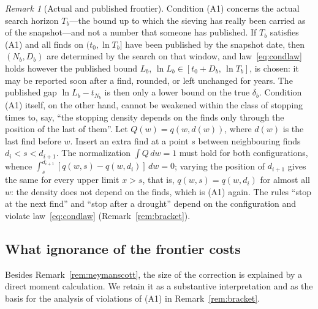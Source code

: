 \documentclass[11pt,a4paper]{article}
\theoremstyle{plain}
\theoremstyle{remark}
\newtheorem{remark}{Remark}
\begin{document}
\begin{remark}[Actual and published frontier]\label{rem:weaker}
Condition (A1) concerns the actual search horizon $T_b$---the bound up to which the
sieving has really been carried as of the snapshot---and not a number that someone
has published. If $T_b$ satisfies (A1) and all finds on $(t_0,\ln T_b]$ have been
published by the snapshot date, then $(N_b,D_b)$ are determined by the search on
that window, and law~\eqref{eq:condlaw} holds however the published bound $L_b$,
$\ln L_b\in[t_0+D_b,\,\ln T_b]$, is chosen: it may be reported soon after a find, rounded,
or left unchanged for years. The published gap $\ln L_b-t_{N_b}$ is then only a
lower bound on the true $\delta_b$. Condition (A1) itself, on the other hand,
cannot be weakened within the class of stopping times to, say, ``the stopping
density depends on the finds only through the position of the last of them''. Let
$Q(w)=q(w,d(w))$, where $d(w)$ is the last find before $w$. Insert an extra find at
a point $s$ between neighbouring finds $d_i<s<d_{i+1}$. The normalization
$\int Q\,dw=1$ must hold for both configurations, whence
$\int_s^{d_{i+1}}[q(w,s)-q(w,d_i)]\,dw=0$; varying the position of $d_{i+1}$ gives
the same for every upper limit $x>s$, that is, $q(w,s)=q(w,d_i)$ for almost all
$w$: the density does not depend on the finds, which is (A1) again.
The rules ``stop at the next find'' and ``stop after a drought'' depend on the
configuration and violate law~\eqref{eq:condlaw} (Remark~\ref{rem:bracket}).
\end{remark}

\subsection{What ignorance of the frontier costs}\label{sec:cost}

Besides Remark~\ref{rem:neymanscott}, the size of the correction is explained by
a direct moment calculation. We retain it as a substantive interpretation and as
the basis for the analysis of violations of (A1) in Remark~\ref{rem:bracket}.
\end{document}
